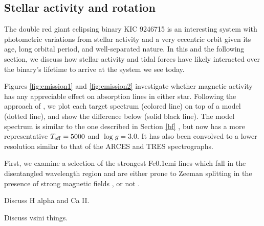 \subsection{Stellar activity and rotation}\label{actrot}
The double red giant eclipsing binary KIC 9246715 is an interesting system with photometric variations from stellar activity and a very eccentric orbit given its age, long orbital period, and well-separated nature. In this and the following section, we discuss how stellar activity and tidal forces have likely interacted over the binary's lifetime to arrive at the system we see today.

Figures \ref{fig:emission1} and \ref{fig:emission2} investigate whether magnetic activity has any appreciable effect on absorption lines in either star. Following the approach of \citet{fro12}, we plot each target spectrum (colored line) on top of a model (dotted line), and show the difference below (solid black line). The model spectrum is similar to the one described in Section \ref{bf} \citep{all03}, but now has a more representative $T_{\rm{eff}} = 5000$ and $\log g = 3.0$. It has also been convolved to a lower resolution similar to that of the ARCES and TRES spectrographs.

First, we examine a selection of the strongest {\rm Fe}\kern 0.1em{\sc i} lines which fall in the disentangled wavelength region and are either prone to Zeeman splitting in the presence of strong magnetic fields \citep{har73}, or not \citep{sis70}. 

Discuss H alpha and Ca II.

Discuss vsini things.
  
  